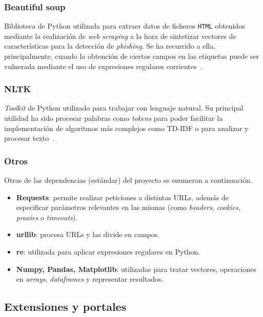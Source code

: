 \subsubsection{Beautiful soup}

Biblioteca de Python utilizada para extraer datos de ficheros \texttt{HTML} obtenidos mediante la realización de \textit{web scraping} a la hora de sintetizar vectores de características para la detección de \textit{phishing}. Se ha recurrido a ella, principalmente, cuando la obtención de ciertos campos en las etiquetas puede ser vulnerada mediante el uso de expresiones regulares corrientes~\cite{bs4Docs}.


\subsubsection{NLTK}

\textit{Toolkit} de Python utilizado para trabajar con lenguaje natural. Su principal utilidad ha sido procesar palabras como \textit{tokens} para poder facilitar la implementación de algoritmos más complejos como TD-IDF o para analizar y procesar texto~\cite{nltk}.

\subsubsection{Otros}

Otras de las dependencias (estándar) del proyecto se enumeran a continuación.

\begin{itemize}
	\item \textbf{Requests}: permite realizar peticiones a distintas URLs, además de especificar parámetros relevantes en las mismas (como \textit{headers}, \textit{cookies}, \textit{proxies} o \textit{timeouts}).
	\item \textbf{urllib}: procesa URLs y las divide en campos.
	\item \textbf{re}: utilizada para aplicar expresiones regulares en Python.
	\item \textbf{Numpy, Pandas, Matplotlib}: utilizadas para tratar vectores, operaciones en \textit{arrays}, \textit{dataframes} y representar resultados.
\end{itemize}


\subsection{Extensiones y portales}

